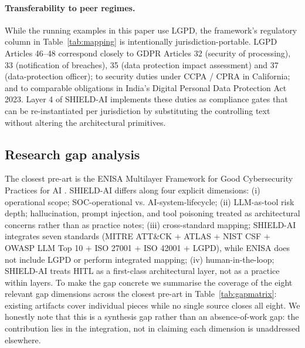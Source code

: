 \documentclass[preprint,12pt,authoryear]{elsarticle}
\begin{document}
\paragraph{Transferability to peer regimes.} While the running examples in this paper use LGPD, the framework's regulatory column in Table~\ref{tab:mapping} is intentionally jurisdiction-portable. LGPD Articles 46--48 correspond closely to GDPR Articles 32 (security of processing), 33 (notification of breaches), 35 (data protection impact assessment) and 37 (data-protection officer); to security duties under CCPA / CPRA in California; and to comparable obligations in India's Digital Personal Data Protection Act 2023. Layer 4 of SHIELD-AI implements these duties as compliance gates that can be re-instantiated per jurisdiction by substituting the controlling text without altering the architectural primitives.

\subsection{Research gap analysis}
\label{ssec:gap}
The closest pre-art is the ENISA Multilayer Framework for Good Cybersecurity Practices for AI \citep{enisa2023multilayer}. SHIELD-AI differs along four explicit dimensions: (i) operational scope; SOC-operational vs. AI-system-lifecycle; (ii) LLM-as-tool risk depth; hallucination, prompt injection, and tool poisoning treated as architectural concerns rather than as practice notes; (iii) cross-standard mapping; SHIELD-AI integrates seven standards (MITRE ATT\&CK + ATLAS + NIST CSF + OWASP LLM Top 10 + ISO 27001 + ISO 42001 + LGPD), while ENISA does not include LGPD or perform integrated mapping; (iv) human-in-the-loop; SHIELD-AI treats HITL as a first-class architectural layer, not as a practice within layers. To make the gap concrete we summarise the coverage of the eight relevant gap dimensions across the closest pre-art in Table~\ref{tab:gapmatrix}: existing artifacts cover individual pieces while no single source closes all eight. We honestly note that this is a synthesis gap rather than an absence-of-work gap: the contribution lies in the integration, not in claiming each dimension is unaddressed elsewhere.
\end{document}
